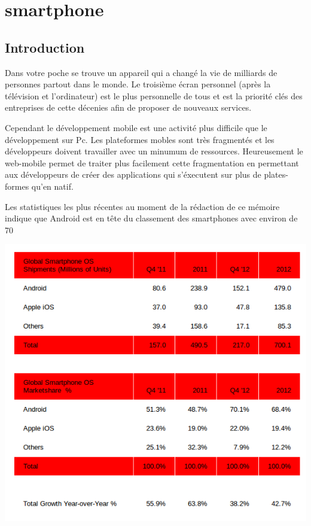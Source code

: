 \chapter{smartphone}
\label{ch:smartphone}

\section*{Introduction}

Dans votre poche se trouve un appareil qui a changé la vie de milliards de personnes partout dans le monde. Le troisième écran personnel (après la télévision et l’ordinateur) est le plus personnelle de tous et  est la priorité clés des entreprises de cette décenies afin de proposer de nouveaux services.

Cependant le développement mobile est une activité plus difficile que le développement sur Pc. Les plateformes mobles sont très fragmentés et les développeurs doivent travailler avec un minumum de ressources. Heureusement le web-mobile permet de traiter plus facilement cette fragmentation en permettant aux développeurs de créer des applications qui s’éxecutent sur plus de plates-formes qu’en natif.

Les statistiques les plus récentes au moment de la rédaction de ce mémoire indique que Android est en tête du classement des smartphones avec environ de 70%


\begin{center}
\includegraphics[width=14cm]{img/marche_smartphone.png}
\label{Parts de marché smartphone  }
\end{center}

